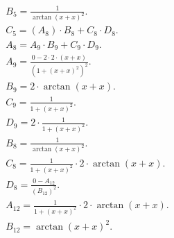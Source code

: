 \documentclass[12pt,a4paper]{extreport}
\begin{document}
\begin{multline}
\\
B_{5} = \frac{1}{\arctan(x + x) ^ {2}}.\\
C_{5} = (A_{8}) \cdot B_{8} + C_{8} \cdot D_{8}.\\
A_{8} = A_{9} \cdot B_{9} + C_{9} \cdot D_{9}.\\
A_{9} = \frac{0 - 2 \cdot 2 \cdot (x + x)}{(1 + (x + x) ^ {2}) ^ {2}}.\\
B_{9} = 2 \cdot \arctan(x + x).\\
C_{9} = \frac{1}{1 + (x + x) ^ {2}}.\\
D_{9} = 2 \cdot \frac{1}{1 + (x + x) ^ {2}}.\\
B_{8} = \frac{1}{\arctan(x + x) ^ {2}}.\\
C_{8} = \frac{1}{1 + (x + x) ^ {2}} \cdot 2 \cdot \arctan(x + x).\\
D_{8} = \frac{0 - A_{12}}{(B_{12}) ^ {2}}.\\
A_{12} = \frac{1}{1 + (x + x) ^ {2}} \cdot 2 \cdot \arctan(x + x).\\
B_{12} = \arctan(x + x) ^ {2}.\\
\end{multline}

\printbibliography
\end{document}
